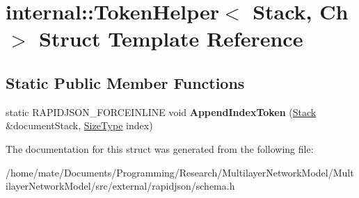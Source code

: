 \hypertarget{structinternal_1_1TokenHelper}{}\section{internal\+:\+:Token\+Helper$<$ Stack, Ch $>$ Struct Template Reference}
\label{structinternal_1_1TokenHelper}
\subsection*{Static Public Member Functions}
\begin{DoxyCompactItemize}
\item 
static R\+A\+P\+I\+D\+J\+S\+O\+N\+\_\+\+F\+O\+R\+C\+E\+I\+N\+L\+I\+NE void {\bfseries Append\+Index\+Token} (\hyperlink{classinternal_1_1Stack}{Stack} \&document\+Stack, \hyperlink{rapidjson_8h_a5ed6e6e67250fadbd041127e6386dcb5}{Size\+Type} index)\hypertarget{structinternal_1_1TokenHelper_a7b1864bfe6d4014ba7a5114acb26b3ae}{}\label{structinternal_1_1TokenHelper_a7b1864bfe6d4014ba7a5114acb26b3ae}

\end{DoxyCompactItemize}


The documentation for this struct was generated from the following file\+:\begin{DoxyCompactItemize}
\item 
/home/mate/\+Documents/\+Programming/\+Research/\+Multilayer\+Network\+Model/\+Multilayer\+Network\+Model/src/external/rapidjson/schema.\+h\end{DoxyCompactItemize}
